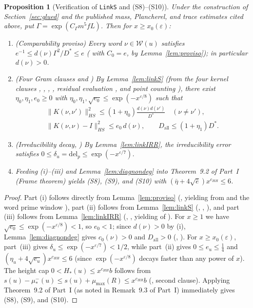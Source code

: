 \documentclass[11pt]{amsart}
\newcommand{\eps}{\varepsilon}
\theoremstyle{plain}
\newtheorem{proposition}[theorem]{Proposition}
\theoremstyle{definition}
\numberwithin{equation}{section}
\begin{document}
\begin{proposition}[Verification of \texttt{LinkS} and (S8)--(S10)]\label{prop:S8S10}
Under the construction of Section~\ref{sec:glued} and the published mass, Plancherel, and trace
estimates cited above, put $\Gamma=\exp(C_\Gamma m^5 f L)$. Then for $x\ge x_0(\eps)$:
\begin{enumerate}[label=(\roman*)]
\item \textup{(Comparability proviso)} Every word $\nu\in\mathcal W(u)$ satisfies
  $e^{-1}\le d(\nu)\Gamma^2/D^\ast\le e$ ( with $C_0=e$, by
  Lemma~\ref{lem:proviso}); in particular $d(\nu)>0$.
\item \textup{(Four Gram clauses and )} By Lemma~\ref{lem:linkS} (from the four kernel
  clauses , , , , residual evaluation
  , and point counting ), there exist
  $\eta_0,\eta_1,e_0\ge0$ with $\eta_0,\eta_1,\sqrt{e_0}\le\exp(-x^{\eps/8})$ such that
  \begin{gather*}
  \|K(\nu,\nu')\|_{HS}^2\le(1+\eta_0)\frac{d(\nu)d(\nu')}{D^\ast}\quad(\nu\neq\nu'),\\
  \|K(\nu,\nu)-I\|_{HS}^2\le e_0\,d(\nu),\qquad D_{\mathrm{all}}\le(1+\eta_1)D^\ast.
  \end{gather*}
\item \textup{(Irreducibility decay, )} By Lemma~\ref{lem:linkIRR}, the
  irreducibility error satisfies $0\le\delta_u=\mathrm{del}_p\le\exp(-x^{\eps/7})$.
\item Feeding (i)--(iii) and Lemma~\ref{lem:diagnondeg} into Theorem~9.2 of Part~I (Frame theorem)
  yields \textup{(S8)}, \textup{(S9)}, and \textup{(S10)} with
  $(\bar\eta+4\sqrt{\bar e})x^{c_{HH}}\le 6$.
\end{enumerate}
\end{proposition}

\begin{proof}
Part (i) follows directly from Lemma~\ref{lem:proviso} (, yielding
 from  and the word prime window ), part
(ii) follows from Lemma~\ref{lem:linkS} (,
, ), and part (iii) follows from
Lemma~\ref{lem:linkIRR} (, , yielding
 of ). For $x\ge1$ we have $\sqrt{e_0}\le\exp(-x^{\eps/8})<1$, so
$e_0<1$; since $d(\nu)>0$ by (i), Lemma~\ref{lem:diagnondeg} gives $c_0(\nu)>0$ and
$D_{\mathrm{all}}>0$ (, ). For $x\ge x_0(\eps)$, part~(iii) gives
$\delta_u\le\exp(-x^{\eps/7})<1/2$, while part~(ii) gives $0\le e_u\le\frac14$ and
$(\eta_u+4\sqrt{e_u})x^{c_{HH}}\le 6$ (since $\exp(-x^{\eps/8})$ decays faster than any power of
$x$). The height cap $0<H_\ast(u)\le x^{c_{HH}}b$ follows from
$s(u)-\mu_\ast^-(u)\le s(u)+\mu_{\max}(R)\le x^{c_{HH}}b$ (, second clause).
Applying Theorem~9.2 of Part~I (as noted in Remark~9.3 of Part~I) immediately gives \textup{(S8)},
\textup{(S9)}, and \textup{(S10)}.
\end{proof}
\end{document}
